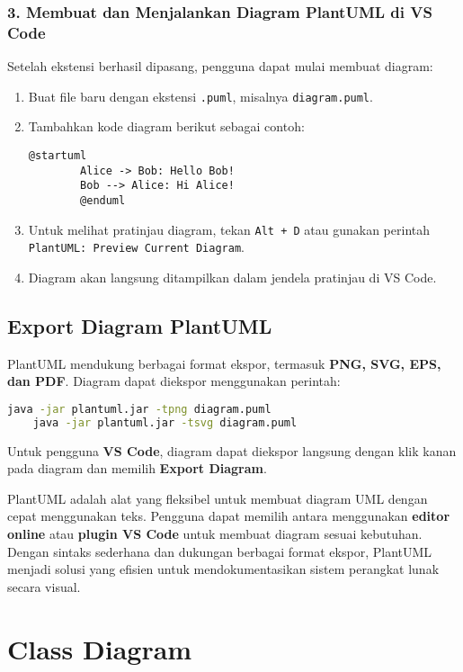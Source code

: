 \subsubsection{3. Membuat dan Menjalankan Diagram PlantUML di VS Code}
Setelah ekstensi berhasil dipasang, pengguna dapat mulai membuat diagram:
\begin{enumerate}
	\item Buat file baru dengan ekstensi \texttt{.puml}, misalnya \texttt{diagram.puml}.
	\item Tambahkan kode diagram berikut sebagai contoh:
	\begin{lstlisting}[language=puml]
		@startuml
		Alice -> Bob: Hello Bob!
		Bob --> Alice: Hi Alice!
		@enduml
	\end{lstlisting}
	\item Untuk melihat pratinjau diagram, tekan \texttt{Alt + D} atau gunakan perintah \texttt{PlantUML: Preview Current Diagram}.
	\item Diagram akan langsung ditampilkan dalam jendela pratinjau di VS Code.
\end{enumerate}

\subsection{Export Diagram PlantUML}
PlantUML mendukung berbagai format ekspor, termasuk \textbf{PNG, SVG, EPS, dan PDF}. Diagram dapat diekspor menggunakan perintah:

\begin{lstlisting}[language=bash]
	java -jar plantuml.jar -tpng diagram.puml
	java -jar plantuml.jar -tsvg diagram.puml
\end{lstlisting}

Untuk pengguna \textbf{VS Code}, diagram dapat diekspor langsung dengan klik kanan pada diagram dan memilih \textbf{Export Diagram}.

PlantUML adalah alat yang fleksibel untuk membuat diagram UML dengan cepat menggunakan teks. Pengguna dapat memilih antara menggunakan \textbf{editor online} atau \textbf{plugin VS Code} untuk membuat diagram sesuai kebutuhan. Dengan sintaks sederhana dan dukungan berbagai format ekspor, PlantUML menjadi solusi yang efisien untuk mendokumentasikan sistem perangkat lunak secara visual.

\section{Class Diagram}

